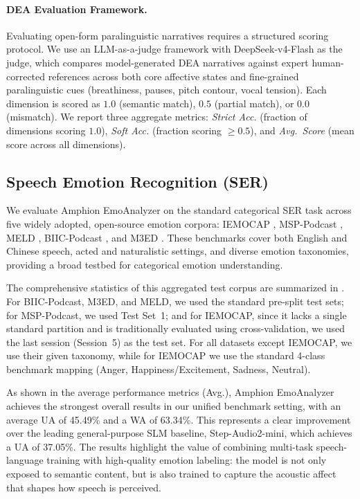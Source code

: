 \paragraph{DEA Evaluation Framework.}
Evaluating open-form paralinguistic narratives requires a structured scoring protocol. We use an LLM-as-a-judge framework with DeepSeek-v4-Flash as the judge, which compares model-generated DEA narratives against expert human-corrected references across both core affective states and fine-grained paralinguistic cues (breathiness, pauses, pitch contour, vocal tension). Each dimension is scored as $1.0$ (semantic match), $0.5$ (partial match), or $0.0$ (mismatch). We report three aggregate metrics: \textit{Strict Acc.} (fraction of dimensions scoring $1.0$), \textit{Soft Acc.} (fraction scoring $\geq 0.5$), and \textit{Avg.\ Score} (mean score across all dimensions).


\subsection{Speech Emotion Recognition (SER)}

We evaluate Amphion EmoAnalyzer on the standard categorical SER task across five widely adopted, open-source emotion corpora: IEMOCAP \cite{IEMOCAP}, MSP-Podcast \cite{MSP-Podcast}, MELD \cite{MELD}, BIIC-Podcast \cite{BIIC-Podcast}, and M3ED \cite{M3ED}. These benchmarks cover both English and Chinese speech, acted and naturalistic settings, and diverse emotion taxonomies, providing a broad testbed for categorical emotion understanding.

The comprehensive statistics of this aggregated test corpus are summarized in . For BIIC-Podcast, M3ED, and MELD, we used the standard pre-split test sets; for MSP-Podcast, we used Test Set~1; and for IEMOCAP, since it lacks a single standard partition and is traditionally evaluated using cross-validation, we used the last session (Session~5) as the test set. For all datasets except IEMOCAP, we use their given taxonomy, while for IEMOCAP we use the standard 4-class benchmark mapping (Anger, Happiness/Excitement, Sadness, Neutral).





As shown in the average performance metrics (Avg.), Amphion EmoAnalyzer achieves the strongest overall results in our unified benchmark setting, with an average UA of 45.49\% and a WA of 63.34\%. This represents a clear improvement over the leading general-purpose SLM baseline, Step-Audio2-mini, which achieves a UA of 37.05\%. The results highlight the value of combining multi-task speech-language training with high-quality emotion labeling: the model is not only exposed to semantic content, but is also trained to capture the acoustic affect that shapes how speech is perceived.

